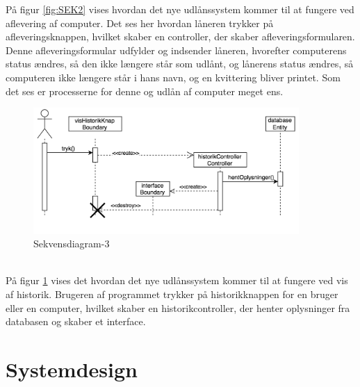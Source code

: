 \documentclass[a4paper]{article}
\begin{document}
På figur \ref{fig:SEK2} vises hvordan det nye udlånssystem kommer til at fungere ved aflevering af computer. Det ses her hvordan låneren trykker på afleveringsknappen, hvilket skaber en controller, der skaber afleveringsformularen. Denne afleveringsformular udfylder og indsender låneren, hvorefter computerens status ændres, så den ikke længere står som udlånt, og lånerens status ændres, så computeren ikke længere står i hans navn, og en kvittering bliver printet. Som det ses er processerne for denne og udlån af computer meget ens.
\begin{figure}[h!]
\includegraphics[width=0.9\textwidth]{SekvensHistorik}
  \caption{Sekvensdiagram-3}
    \label{fig:SEK3}
  \centering
\end{figure}\\
På figur \ref{fig:SEK3} vises det hvordan det nye udlånssystem kommer til at fungere ved vis af historik. Brugeren af programmet trykker på historikknappen for en bruger eller en computer, hvilket skaber en historikcontroller, der henter oplysninger fra databasen og skaber et interface. 
\newpage
\section{Systemdesign}
\end{document}
